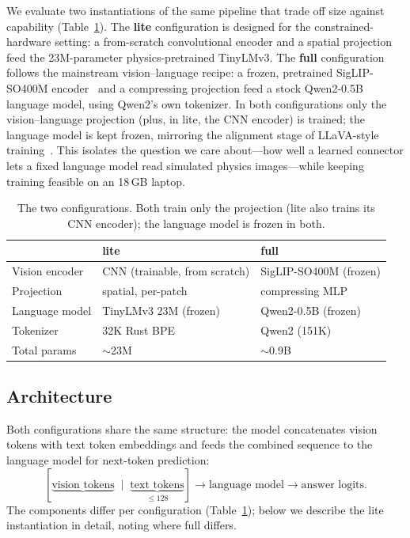 \documentclass[11pt]{article}
\begin{document}
We evaluate two instantiations of the same pipeline that trade off size against
capability (Table~\ref{tab:configs}). The \textbf{lite} configuration is designed
for the constrained-hardware setting: a from-scratch convolutional encoder and a
spatial projection feed the 23M-parameter physics-pretrained TinyLMv3. The
\textbf{full} configuration follows the mainstream vision--language recipe: a
frozen, pretrained SigLIP-SO400M encoder~\cite{zhai2023siglip} and a compressing
projection feed a stock Qwen2-0.5B language model, using Qwen2's own tokenizer. In
both configurations only the vision--language projection (plus, in lite, the CNN
encoder) is trained; the language model is kept frozen, mirroring the alignment
stage of LLaVA-style training~\cite{liu2023llava}. This isolates the question we
care about---how well a learned connector lets a fixed language model read
simulated physics images---while keeping training feasible on an 18\,GB laptop.

\begin{table}[t]
\centering
\caption{The two configurations. Both train only the projection (lite also
trains its CNN encoder); the language model is frozen in both.}
\label{tab:configs}
\begin{tabular}{lll}
\toprule
 & \textbf{lite} & \textbf{full} \\
\midrule
Vision encoder & CNN (trainable, from scratch) & SigLIP-SO400M (frozen) \\
Projection     & spatial, per-patch            & compressing MLP \\
Language model & TinyLMv3 23M (frozen)         & Qwen2-0.5B (frozen) \\
Tokenizer      & 32K Rust BPE                  & Qwen2 (151K) \\
Total params   & $\sim$23M                     & $\sim$0.9B \\
\bottomrule
\end{tabular}
\end{table}

\subsection{Architecture}

Both configurations share the same structure: the model concatenates vision
tokens with text token embeddings and feeds the combined sequence to the language
model for next-token prediction:
\[
[\underbrace{\text{vision tokens}}\;\;|\;\;\underbrace{\text{text tokens}}_{\le 128}] \rightarrow \text{language model} \rightarrow \text{answer logits}.
\]
The components differ per configuration (Table~\ref{tab:configs}); below we
describe the lite instantiation in detail, noting where full differs.
\end{document}
